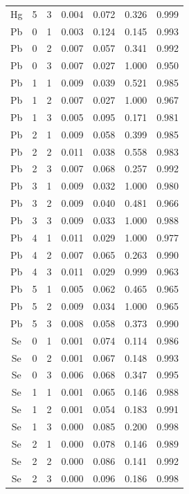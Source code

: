 \documentclass[ms, hidelinks]{uncgdissertationexp}
\theoremstyle{plain}
\theoremstyle{definition}
\theoremstyle{remark}
\begin{document}
\begin{longtable}{ccccccc}
Hg & 5 & 3 & 0.004 & 0.072 & 0.326 & 0.999\\
\rowcolor{gray!6}  Pb & 0 & 1 & 0.003 & 0.124 & 0.145 & 0.993\\
Pb & 0 & 2 & 0.007 & 0.057 & 0.341 & 0.992\\
\rowcolor{gray!6}  Pb & 0 & 3 & 0.007 & 0.027 & 1.000 & 0.950\\
Pb & 1 & 1 & 0.009 & 0.039 & 0.521 & 0.985\\
\rowcolor{gray!6}  Pb & 1 & 2 & 0.007 & 0.027 & 1.000 & 0.967\\
Pb & 1 & 3 & 0.005 & 0.095 & 0.171 & 0.981\\
\rowcolor{gray!6}  Pb & 2 & 1 & 0.009 & 0.058 & 0.399 & 0.985\\
Pb & 2 & 2 & 0.011 & 0.038 & 0.558 & 0.983\\
\rowcolor{gray!6}  Pb & 2 & 3 & 0.007 & 0.068 & 0.257 & 0.992\\
Pb & 3 & 1 & 0.009 & 0.032 & 1.000 & 0.980\\
\rowcolor{gray!6}  Pb & 3 & 2 & 0.009 & 0.040 & 0.481 & 0.966\\
Pb & 3 & 3 & 0.009 & 0.033 & 1.000 & 0.988\\
\rowcolor{gray!6}  Pb & 4 & 1 & 0.011 & 0.029 & 1.000 & 0.977\\
Pb & 4 & 2 & 0.007 & 0.065 & 0.263 & 0.990\\
\rowcolor{gray!6}  Pb & 4 & 3 & 0.011 & 0.029 & 0.999 & 0.963\\
Pb & 5 & 1 & 0.005 & 0.062 & 0.465 & 0.965\\
\rowcolor{gray!6}  Pb & 5 & 2 & 0.009 & 0.034 & 1.000 & 0.965\\
Pb & 5 & 3 & 0.008 & 0.058 & 0.373 & 0.990\\
\rowcolor{gray!6}  Se & 0 & 1 & 0.001 & 0.074 & 0.114 & 0.986\\
Se & 0 & 2 & 0.001 & 0.067 & 0.148 & 0.993\\
\rowcolor{gray!6}  Se & 0 & 3 & 0.006 & 0.068 & 0.347 & 0.995\\
Se & 1 & 1 & 0.001 & 0.065 & 0.146 & 0.988\\
\rowcolor{gray!6}  Se & 1 & 2 & 0.001 & 0.054 & 0.183 & 0.991\\
Se & 1 & 3 & 0.000 & 0.085 & 0.200 & 0.998\\
\rowcolor{gray!6}  Se & 2 & 1 & 0.000 & 0.078 & 0.146 & 0.989\\
Se & 2 & 2 & 0.000 & 0.086 & 0.141 & 0.992\\
\rowcolor{gray!6}  Se & 2 & 3 & 0.000 & 0.096 & 0.186 & 0.998\\

\end{longtable}
\end{document}
